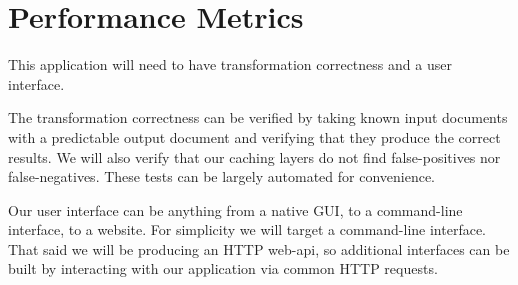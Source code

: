 %
%
\section*{Performance Metrics}

This application will need to have transformation correctness and a user interface.

The transformation correctness can be verified by taking known input documents with a predictable output document and verifying that they produce the correct results.
We will also verify that our caching layers do not find false-positives nor false-negatives.
These tests can be largely automated for convenience.

Our user interface can be anything from a native GUI, to a command-line interface, to a website.
For simplicity we will target a command-line interface.
That said we will be producing an HTTP web-api, so additional interfaces can be built by interacting with our application via common HTTP requests.


